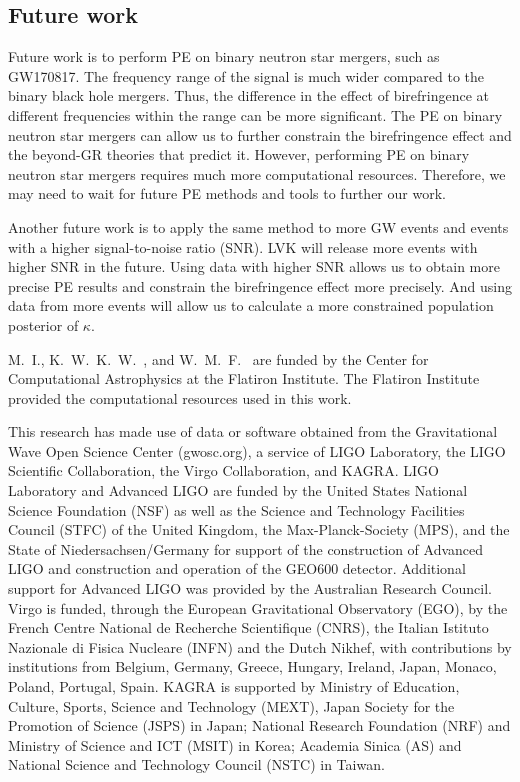 \documentclass[aps,prd,twocolumn,superscriptaddress,preprintnumbers,floatfix,nofootinbib]{revtex4-2}
\begin{document}
\subsection{Future work}
Future work is to perform PE on binary neutron star mergers, such as GW170817.
The frequency range of the signal is much wider compared to the binary black hole mergers.
Thus, the difference in the effect of birefringence at different frequencies within the range can be more significant.
The PE on binary neutron star mergers can allow us to further constrain the birefringence effect and the beyond-GR theories that predict it.
However, performing PE on binary neutron star mergers requires much more computational resources.
Therefore, we may need to wait for future PE methods and tools to further our work.

Another future work is to apply the same method to more GW events and events with a higher signal-to-noise ratio (SNR).
LVK will release more events with higher SNR in the future.
Using data with higher SNR allows us to obtain more precise PE results and constrain the birefringence effect more precisely.
And using data from more events will allow us to calculate a more constrained population posterior of $\kappa$.

\begin{acknowledgments}
M.~I., K.~W.~K.~W.~, and W.~M.~F.~ are funded by the Center for Computational Astrophysics at the Flatiron Institute.
The Flatiron Institute provided the computational resources used in this work.

This research has made use of data or software obtained from the Gravitational Wave Open Science Center (gwosc.org), a service of LIGO Laboratory, the LIGO Scientific Collaboration, the Virgo Collaboration, and KAGRA.
LIGO Laboratory and Advanced LIGO are funded by the United States National Science Foundation (NSF) as well as the Science and Technology Facilities Council (STFC) of the United Kingdom, the Max-Planck-Society (MPS), and the State of Niedersachsen/Germany for support of the construction of Advanced LIGO and construction and operation of the GEO600 detector.
Additional support for Advanced LIGO was provided by the Australian Research Council.
Virgo is funded, through the European Gravitational Observatory (EGO), by the French Centre National de Recherche Scientifique (CNRS), the Italian Istituto Nazionale di Fisica Nucleare (INFN) and the Dutch Nikhef, with contributions by institutions from Belgium, Germany, Greece, Hungary, Ireland, Japan, Monaco, Poland, Portugal, Spain.
KAGRA is supported by Ministry of Education, Culture, Sports, Science and Technology (MEXT), Japan Society for the Promotion of Science (JSPS) in Japan; National Research Foundation (NRF) and Ministry of Science and ICT (MSIT) in Korea; Academia Sinica (AS) and National Science and Technology Council (NSTC) in Taiwan.
\end{acknowledgments}


\end{document}

